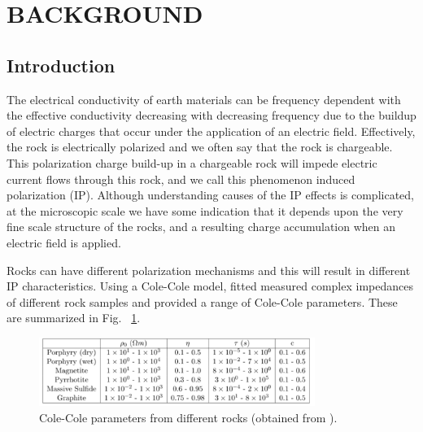 \documentclass[letterpaper,11pt]{article}
\title{\normalsize}
\begin{document}

\newpage

\tableofcontents
\newpage




\section{BACKGROUND}

\subsection{Introduction}
The electrical conductivity of earth materials can be frequency dependent with the effective conductivity decreasing with decreasing frequency due to the buildup of electric charges that occur under the application of an electric field. Effectively, the rock is electrically polarized and we often say that the rock is chargeable. This polarization charge build-up in a chargeable rock will impede electric current flows through this rock, and we call this phenomenon induced polarization (IP). Although understanding causes of the IP effects is complicated, at the microscopic scale we have some indication that it depends upon the very fine scale structure of the rocks, and a resulting charge accumulation when an electric field is applied.

Rocks can have different polarization mechanisms and this will result in different IP characteristics. Using a Cole-Cole model, \cite{Pelton1978} fitted measured complex impedances of different rock samples and provided a range of Cole-Cole parameters. These are summarized in  Fig. ~\ref{Fig:tablerocks}. 

\begin{figure}[htb]
  \centering
  \includegraphics[width=0.8\textwidth]{figures/tablerocks.png}
  \caption{Cole-Cole parameters from different rocks (obtained from \cite{Pelton1978}).}
  \label{Fig:tablerocks}
\end{figure}
\end{document}
